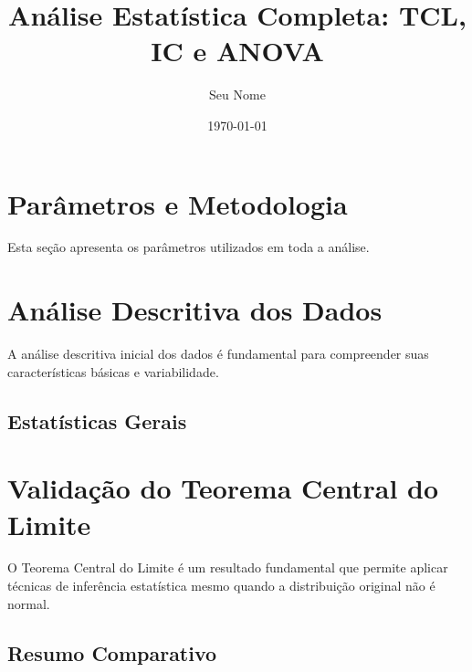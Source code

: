 \documentclass[12pt,a4paper]{article}
\title{Análise Estatística Completa: TCL, IC e ANOVA}
\author{Seu Nome}
\date{\today}
\begin{document}
\maketitle

\tableofcontents
\newpage

\section{Parâmetros e Metodologia}

Esta seção apresenta os parâmetros utilizados em toda a análise.



\section{Análise Descritiva dos Dados}

A análise descritiva inicial dos dados é fundamental para compreender suas 
características básicas e variabilidade.

\subsection{Estatísticas Gerais}



\section{Validação do Teorema Central do Limite}

O Teorema Central do Limite é um resultado fundamental que permite aplicar 
técnicas de inferência estatística mesmo quando a distribuição original não 
é normal.

\subsection{Resumo Comparativo}
\end{document}
